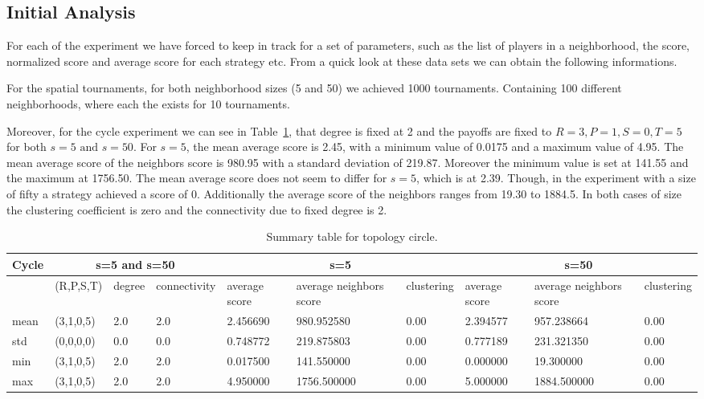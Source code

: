 \subsection{Initial Analysis}

For each of the experiment we have forced to keep in track for a set of parameters,
such as the list of players in a neighborhood, the score, normalized score and
average score for each strategy etc. From a quick look at these data sets
we can obtain the following informations.

For the spatial tournaments, for both neighborhood sizes (5 and 50)
we achieved 1000 tournaments. Containing 100 different neighborhoods, where each
the exists for 10 tournaments.

Moreover, for the cycle experiment we can see in Table~\ref{sum-cicle}, that degree is
fixed at 2 and the payoffs are fixed to \(R=3, P=1, S=0, T=5\) for both
\( s=5\textrm{ and } s=50 \). For \(s=5\), the mean average score
is 2.45, with a minimum value of 0.0175 and a maximum value of 4.95. The
mean average score of the neighbors score is 980.95 with a standard deviation
of 219.87. Moreover the minimum value is set at 141.55 and the maximum at
1756.50. The mean average score does not seem to differ for \(s=5\),
which is at 2.39. Though, in the experiment with a size of fifty a strategy
achieved a score of 0. Additionally the average score of the neighbors ranges
from 19.30 to 1884.5. In both cases of size the clustering coefficient is zero
and the connectivity due to fixed degree is 2.

\begin{table}[!hbtp]
\centering
\begin{adjustbox}{width=1\textwidth}
\small
\begin{tabular}{@{}|l|l|l|l|l|l|l|l|l|l|@{}}
\toprule
Cycle & \multicolumn{3}{c}{s=5 and s=50}  & \multicolumn{3}{c}{s=5}                              & \multicolumn{3}{c}{s=50}                             \\\midrule
       & (R,P,S,T) & degree & connectivity & average score & average neighbors score & clustering & average score & average neighbors score & clustering \\\midrule
mean   & (3,1,0,5) & 2.0    & 2.0          & 2.456690      & 980.952580              & 0.00       & 2.394577      & 957.238664              & 0.00       \\\midrule
std    & (0,0,0,0) & 0.0    & 0.0          & 0.748772      & 219.875803              & 0.00       & 0.777189      & 231.321350              & 0.00       \\\midrule
min    & (3,1,0,5) & 2.0    & 2.0          & 0.017500      & 141.550000              & 0.00       & 0.000000      & 19.300000               & 0.00       \\\midrule
max    & (3,1,0,5) & 2.0    & 2.0          & 4.950000      & 1756.500000             & 0.00       & 5.000000      & 1884.500000             & 0.00       \\ \bottomrule
\end{tabular}
\end{adjustbox}
\caption{Summary table for topology circle.}
\label{sum-cicle}
\end{table}


